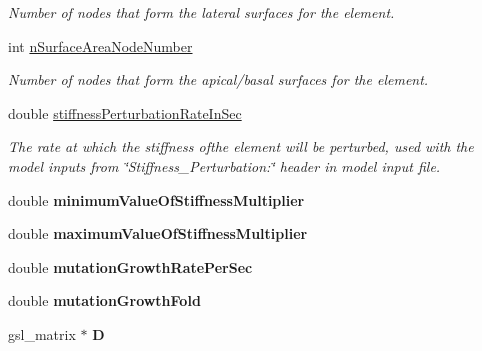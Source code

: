 \begin{DoxyCompactItemize}
\begin{DoxyCompactList}\small\item\em Number of nodes that form the lateral surfaces for the element. \end{DoxyCompactList}\item 
\hypertarget{classShapeBase_a6552406df5c7b4b1e5a96e8b9cc86b0d}{}int \hyperlink{classShapeBase_a6552406df5c7b4b1e5a96e8b9cc86b0d}{n\+Surface\+Area\+Node\+Number}\label{classShapeBase_a6552406df5c7b4b1e5a96e8b9cc86b0d}

\begin{DoxyCompactList}\small\item\em Number of nodes that form the apical/basal surfaces for the element. \end{DoxyCompactList}\item 
\hypertarget{classShapeBase_a525290b7f6921e964666d946b5d6774d}{}double \hyperlink{classShapeBase_a525290b7f6921e964666d946b5d6774d}{stiffness\+Perturbation\+Rate\+In\+Sec}\label{classShapeBase_a525290b7f6921e964666d946b5d6774d}

\begin{DoxyCompactList}\small\item\em The rate at which the stiffness ofthe element will be perturbed, used with the model inputs from \char`\"{}\+Stiffness\+\_\+\+Perturbation\+:\char`\"{} header in model input file. \end{DoxyCompactList}\item 
\hypertarget{classShapeBase_a9988f025f39118d8d29696709e6660d6}{}double {\bfseries minimum\+Value\+Of\+Stiffness\+Multiplier}\label{classShapeBase_a9988f025f39118d8d29696709e6660d6}

\item 
\hypertarget{classShapeBase_a915634dcedd74abf27fd746758bfe935}{}double {\bfseries maximum\+Value\+Of\+Stiffness\+Multiplier}\label{classShapeBase_a915634dcedd74abf27fd746758bfe935}

\item 
\hypertarget{classShapeBase_a35ee77fed372f7702889bebb67875136}{}double {\bfseries mutation\+Growth\+Rate\+Per\+Sec}\label{classShapeBase_a35ee77fed372f7702889bebb67875136}

\item 
\hypertarget{classShapeBase_ac7b83cb76a8f4ec11a4a6292c2899ba2}{}double {\bfseries mutation\+Growth\+Fold}\label{classShapeBase_ac7b83cb76a8f4ec11a4a6292c2899ba2}

\item 
\hypertarget{classShapeBase_a1878efccfc629e53748e8907386825b0}{}gsl\+\_\+matrix $\ast$ {\bfseries D}\label{classShapeBase_a1878efccfc629e53748e8907386825b0}


\end{DoxyCompactItemize}
